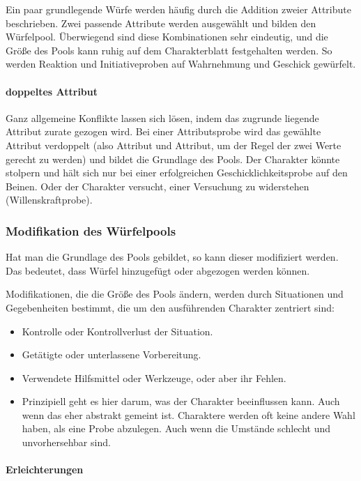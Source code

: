 \documentclass{article}
\begin{document}
Ein paar grundlegende Würfe werden häufig durch die Addition zweier Attribute beschrieben. Zwei passende Attribute werden
ausgewählt und bilden den Würfelpool. Überwiegend sind diese Kombinationen sehr eindeutig, und die Größe des Pools kann
ruhig auf dem Charakterblatt festgehalten werden. So werden Reaktion und Initiativeproben auf Wahrnehmung und Geschick
gewürfelt.

\paragraph{doppeltes Attribut}

Ganz allgemeine Konflikte lassen sich lösen, indem das zugrunde liegende Attribut zurate gezogen wird. Bei einer
Attributsprobe wird das gewählte Attribut verdoppelt (also Attribut und Attribut, um der Regel der zwei Werte gerecht zu
werden) und bildet die Grundlage des Pools. Der Charakter könnte stolpern und hält sich nur bei einer erfolgreichen
Geschicklichkeitsprobe auf den Beinen. Oder der Charakter versucht, einer Versuchung zu widerstehen (Willenskraftprobe).

\subsubsection{Modifikation des Würfelpools}

Hat man die Grundlage des Pools gebildet, so kann dieser modifiziert werden. Das bedeutet, dass Würfel hinzugefügt oder
abgezogen werden können.

Modifikationen, die die Größe des Pools ändern, werden durch Situationen und Gegebenheiten bestimmt, die um den
ausführenden Charakter zentriert sind:

\begin{itemize}
\item Kontrolle oder Kontrollverlust der Situation.
\item Getätigte oder unterlassene Vorbereitung.
\item Verwendete Hilfsmittel oder Werkzeuge, oder aber ihr Fehlen.
\item Prinzipiell geht es hier darum, was der Charakter beeinflussen kann. Auch wenn das eher abstrakt gemeint ist. Charaktere werden oft keine andere Wahl haben, als eine Probe abzulegen. Auch wenn die Umstände schlecht und unvorhersehbar sind.
\end{itemize}

\paragraph{Erleichterungen}
\end{document}

